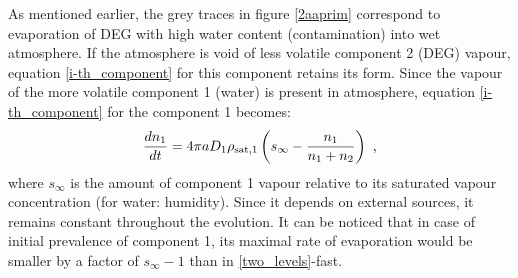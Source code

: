 \documentclass[twoside,twocolumn,9pt]{article}
\begin{document}
As mentioned earlier, the grey traces in figure \ref{2aaprim} correspond to evaporation of DEG with high water content (contamination) into wet atmosphere. If the atmosphere is void of less volatile component 2 (DEG) vapour, equation \ref{i-th_component} for this component retains its form. Since the vapour of the more volatile component 1 (water) is present in atmosphere, equation \ref{i-th_component} for the component 1 becomes:
\begin{equation}
\frac{dn_1}{dt} = 4\pi a D_1\rho_{{\rm sat},1} \left( s_{\infty} - \frac{n_1}{n_1+n_2} \right) \mbox{~,}
\label{with_S}
\end{equation}
where $s_{\infty}$ is the amount of component 1 vapour relative to its saturated vapour concentration (for water: humidity). Since it depends on external sources, it remains constant throughout the evolution. It can be noticed that in case of initial prevalence of component 1, its maximal rate of evaporation would be smaller by a factor of $ s_{\infty}-1$ than in \ref{two_levels}-fast.
\end{document}
